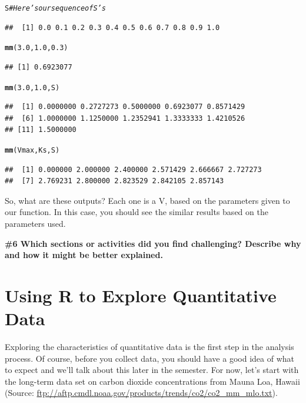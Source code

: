 \documentclass{tufte-handout}\usepackage[]{graphicx}\usepackage[]{xcolor}
\makeatletter
\newcommand{\hlnum}[1]{\textcolor[rgb]{0.686,0.059,0.569}{#1}}%
\newcommand{\hlcom}[1]{\textcolor[rgb]{0.678,0.584,0.686}{\textit{#1}}}%
\newcommand{\hlstd}[1]{\textcolor[rgb]{0.345,0.345,0.345}{#1}}%
\newcommand{\hlkwd}[1]{\textcolor[rgb]{0.737,0.353,0.396}{\textbf{#1}}}%
\newenvironment{kframe}{%
 \def\at@end@of@kframe{}%
 \ifinner\ifhmode%
  \def\at@end@of@kframe{\end{minipage}}%
  \begin{minipage}{\columnwidth}%
 \fi\fi%
 \def\FrameCommand##1{\hskip\@totalleftmargin \hskip-\fboxsep
 \colorbox{shadecolor}{##1}\hskip-\fboxsep
     \hskip-\linewidth \hskip-\@totalleftmargin \hskip\columnwidth}%
 \MakeFramed {\advance\hsize-\width
   \@totalleftmargin\z@ \linewidth\hsize
   \@setminipage}}%
 {\par\unskip\endMakeFramed%
 \at@end@of@kframe}
\newenvironment{knitrout}{}{} %
\makeatother
\begin{document}
\begin{knitrout}
\color{fgcolor}\begin{kframe}
\begin{alltt}
\hlstd{S} \hlcom{# Here's our sequence of S's}
\end{alltt}
\begin{verbatim}
##  [1] 0.0 0.1 0.2 0.3 0.4 0.5 0.6 0.7 0.8 0.9 1.0
\end{verbatim}
\begin{alltt}
\hlkwd{mm}\hlstd{(}\hlnum{3.0}\hlstd{,} \hlnum{1.0}\hlstd{,} \hlnum{0.3}\hlstd{)}
\end{alltt}
\begin{verbatim}
## [1] 0.6923077
\end{verbatim}
\begin{alltt}
\hlkwd{mm}\hlstd{(}\hlnum{3.0}\hlstd{,} \hlnum{1.0}\hlstd{, S)}
\end{alltt}
\begin{verbatim}
##  [1] 0.0000000 0.2727273 0.5000000 0.6923077 0.8571429
##  [6] 1.0000000 1.1250000 1.2352941 1.3333333 1.4210526
## [11] 1.5000000
\end{verbatim}
\begin{alltt}
\hlkwd{mm}\hlstd{(Vmax, Ks, S)}
\end{alltt}
\begin{verbatim}
##  [1] 0.000000 2.000000 2.400000 2.571429 2.666667 2.727273
##  [7] 2.769231 2.800000 2.823529 2.842105 2.857143
\end{verbatim}
\end{kframe}
\end{knitrout}

So, what are these outputs?  Each one is a V, based on the parameters given to our function. In this case, you should see the similar results based on the parameters used. 

\bigskip
\noindent \textbf{\#6 Which sections or activities did you find challenging?  Describe why and how it might be better explained. }
 
\section{Using R to Explore Quantitative Data}

Exploring the characteristics of quantitative data is the first step in the analysis process. Of course, before you collect data, you should have a good idea of what to expect and we'll talk about this later in the semester. For now, let's start with the long-term data set on carbon dioxide concentrations from Mauna Loa, Hawaii (Source: \url{ftp://aftp.cmdl.noaa.gov/products/trends/co2/co2_mm_mlo.txt}). 
\end{document}
